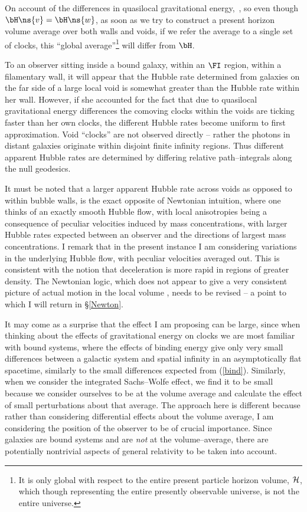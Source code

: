 \documentclass[12pt]{iopart}
\begin{document}
On account of the differences in quasilocal gravitational energy,
\beq \Deriv\dd\tv\tw{}\,,\eeq
so even though $\bH\ns{v}=\bH\ns{w}$, as soon as we try to construct
a present horizon volume average over both walls and voids, if we refer the
average to a single set of clocks, this ``global average''\footnote{It is
only global with respect to the entire present particle horizon volume,
$\cal H$, which though representing the entire presently observable universe,
is not the entire universe.} will differ from $\bH$.

To an observer sitting inside a bound galaxy, within an $\FI$ region,
within a filamentary wall, it will appear that the Hubble rate determined
from galaxies on the far side of a large local void is somewhat greater than
the Hubble rate within her wall. However, if she accounted for the fact that
due to quasilocal gravitational energy differences the comoving clocks
within the voids are ticking faster than her own clocks, the different Hubble
rates become uniform to first approximation. Void ``clocks'' are not
observed directly -- rather the photons in distant galaxies originate
within disjoint finite infinity regions. Thus different apparent Hubble
rates are determined by differing relative path--integrals along the
null geodesics.

It must be noted that a
larger apparent Hubble rate across voids as opposed to within bubble
walls, is the exact opposite of Newtonian intuition, where one thinks
of an exactly smooth Hubble flow, with local anisotropies being
a consequence of peculiar velocities induced by mass concentrations,
with larger Hubble rates expected between an observer and the
directions of largest mass concentrations. I remark that in the present
instance I am considering variations in the underlying Hubble flow,
with peculiar velocities averaged out. This is consistent with the notion
that deceleration is more rapid in regions of greater density.
The Newtonian logic, which does not
appear to give a very consistent picture of actual motion in the
local volume \cite{Whiting1,Whiting2}, needs to be revised -- a
point to which I will return in \S\ref{Newton}.

It may come as a surprise that the effect I am proposing can be large,
since when thinking about the effects of gravitational energy on clocks
we are most familiar with bound systems, where the effects of binding
energy give only very small differences between a galactic system and
spatial infinity in an asymptotically flat spacetime, similarly to
the small differences expected from (\ref{bind}). Similarly, when we
consider the integrated Sachs--Wolfe effect, we find it to be small
because we consider ourselves to be at the volume average and calculate
the effect of small perturbations about that average. The approach here
is different because rather than considering differential effects about
the volume average, I am considering the position of the observer to be
of crucial importance. Since galaxies are bound systems and are {\em not}
at the volume--average, there are potentially nontrivial
aspects of general relativity to be taken into account.
\end{document}
